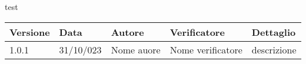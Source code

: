 \documentclass{article}
\begin{document}
    test
    \begin{tabular}{|C{2.5cm}|C{2.5cm}|C{2.5cm}|C{2.5cm}|C{2.5cm}|}
        \hline
        \textbf{Versione} & \textbf{Data} & \textbf{Autore} & \textbf{Verificatore} & \textbf{Dettaglio} \\
        \hline \hline
        \label{Git_Action_Version} 1.0.1 & 31/10/023 & Nome auore & Nome verificatore & descrizione \\
        \hline
    
    \end{tabular}
\end{document}
